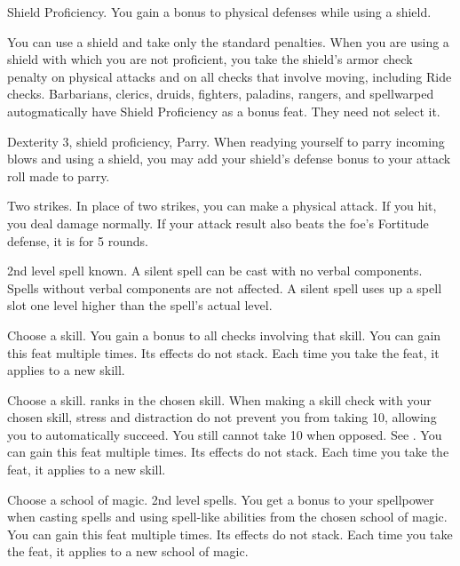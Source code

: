 \featpre Shield Proficiency.
\featben You gain a  bonus to physical defenses while using a shield.

\featben You can use a shield and take only the standard penalties.
When you are using a shield with which you are not proficient, you take the shield's armor check penalty on physical attacks and on all checks that involve moving, including Ride checks.
Barbarians, clerics, druids, fighters, paladins, rangers, and spellwarped autogmatically have Shield Proficiency as a bonus feat.
They need not select it.

\featpres Dexterity 3, shield proficiency, Parry.
\featben When readying yourself to parry incoming blows and using a shield, you may add your shield's defense bonus to your attack roll made to parry.

\featpre Two strikes.
\featben In place of two strikes, you can make a physical attack.
If you hit, you deal damage normally.
If your attack result also beats the foe's Fortitude defense, it is \staggered for 5 rounds.

\featpre 2nd level spell known.
\featben A silent spell can be cast with no verbal components.
Spells without verbal components are not affected.
A silent spell uses up a spell slot one level higher than the spell's actual level.

Choose a skill.
\featben You gain a  bonus to all checks involving that skill.
You can gain this feat multiple times.
Its effects do not stack.
Each time you take the feat, it applies to a new skill.

Choose a skill.
 ranks in the chosen skill.
\featben When making a skill check with your chosen skill, stress and distraction do not prevent you from taking 10, allowing you to automatically succeed.
You still cannot take 10 when opposed.
See .
You can gain this feat multiple times.
Its effects do not stack.
Each time you take the feat, it applies to a new skill.

Choose a school of magic.
\featpre 2nd level spells.
\featben You get a  bonus to your spellpower when casting spells and using spell-like abilities from the chosen school of magic.
You can gain this feat multiple times.
Its effects do not stack.
Each time you take the feat, it applies to a new school of magic.

